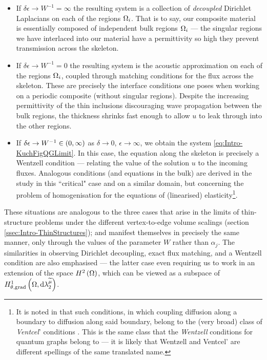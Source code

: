 \begin{itemize}
	\item If $\delta\epsilon\rightarrow W^{-1}=\infty$ the resulting system is a collection of \emph{decoupled} Dirichlet Laplacians on each of the regions $\Omega_i$.
	That is to say, our composite material is essentially composed of independent bulk regions $\Omega_i$ --- the singular regions we have interlaced into our material have a permittivity so high they prevent transmission across the skeleton.
	\item If $\delta\epsilon\rightarrow W^{-1}=0$ the resulting system is the acoustic approximation on each of the regions $\Omega_i$, coupled through matching conditions for the flux across the skeleton.
	These are precisely the interface conditions one poses when working on a periodic composite (without singular regions).
	Despite the increasing permittivity of the thin inclusions discouraging wave propagation between the bulk regions, the thickness shrinks fast enough to allow $u$ to leak through into the other regions.
	\item If $\delta\epsilon\rightarrow W^{-1}\in\left( 0,\infty \right)$ as $\delta\rightarrow0$, $\epsilon\rightarrow\infty$, we obtain the system \eqref{eq:Intro-KuchFigQGLimit}.
	In this case, the equation along the skeleton is precisely a Wentzell condition --- relating the value of the solution $u$ to the incoming fluxes.
	Analogous conditions (and equations in the bulk) are derived in the study \cite{cherednichenko2019homogenisation} in this ``critical" case and on a similar domain, but concerning the problem of homogenisation for the equations of (linearised) elasticity\footnote{It is noted in \cite{cherednichenko2019homogenisation} that such conditions, in which coupling diffusion along a boundary to diffusion along said boundary, belong to the (very broad) class of \emph{Ventcel}' conditions \cite{venttsel1959boundary}. This is the same class that the \emph{Wentzell} conditions for quantum graphs belong to --- it is likely that Wentzell and Ventcel' are different spellings of the same translated name.}.
\end{itemize}
These situations are analogous to the three cases that arise in the limits of thin-structure problems under the different vertex-to-edge volume scalings (section \ref{ssec:Intro-ThinStructures}); and manifest themselves in precisely the same manner, only through the values of the parameter $W$ rather than $\alpha_j$.
The similarities in observing Dirichlet decoupling, exact flux matching, and a Wentzell condition are also emphasised --- the latter case even requiring us to work in an extension of the space $H^2\left( \Omega \right)$, which can be viewed as a subspace of $H^1_{\theta, \mathrm{grad}}\left( \Omega, \mathrm{d}\lambda_2^{\widetilde{\mu}} \right)$.

